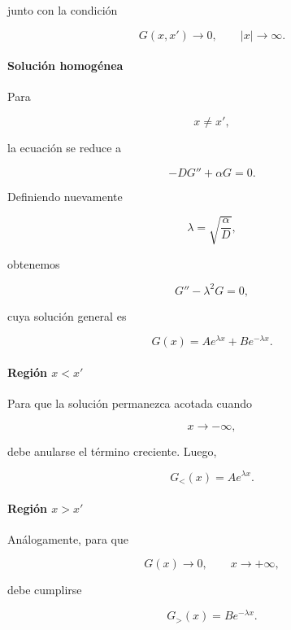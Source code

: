 \documentclass[11pt,spanish]{article}
\begin{document}
junto con la condición

\begin{equation}
G(x,x')
\longrightarrow0,
\qquad
|x|\longrightarrow\infty.
\end{equation}

\paragraph{Solución homogénea}

Para

\[
x\neq x',
\]

la ecuación se reduce a

\begin{equation}
-DG''+\alpha G=0.
\end{equation}

Definiendo nuevamente

\[
\lambda=\sqrt{\frac{\alpha}{D}},
\]

obtenemos

\begin{equation}
G''-\lambda^2G=0,
\end{equation}

cuya solución general es

\begin{equation}
G(x)
=
Ae^{\lambda x}
+
Be^{-\lambda x}.
\end{equation}

\paragraph{Región $x<x'$}

Para que la solución permanezca acotada cuando

\[
x\rightarrow-\infty,
\]

debe anularse el término creciente. Luego,

\begin{equation}
G_<(x)
=
Ae^{\lambda x}.
\end{equation}

\paragraph{Región $x>x'$}

Análogamente, para que

\[
G(x)\rightarrow0,
\qquad
x\rightarrow+\infty,
\]

debe cumplirse

\begin{equation}
G_>(x)
=
Be^{-\lambda x}.
\end{equation}
\end{document}
